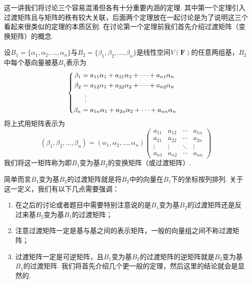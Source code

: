 这一讲我们将讨论三个容易混淆但各有十分重要内涵的定理. 其中第一个定理引入过渡矩阵且与矩阵的秩有较大关联，后面两个定理放在一起讨论是为了说明这三个看起来很类似的定理的本质区别. 在讨论第一个定理前我们首先介绍过渡矩阵（变换矩阵）的概念.
\begin{definition}{}{}
    设$B_1=\{\alpha_1,\alpha_2,\ldots,\alpha_n\}$与$B_2=\{\beta_1,\beta_2,\ldots,\beta_n\}$是线性空间$V(\mathbf{F})$的任意两组基，$B_2$中每个基向量被基$B_1$表示为
    \[ \begin{cases} \begin{aligned}
                \beta_1 & = a_{11}\alpha_1+a_{21}\alpha_2+\cdots+a_{n1}\alpha_n \\
                \beta_2 & = a_{12}\alpha_1+a_{22}\alpha_2+\cdots+a_{n2}\alpha_n \\
                        & \vdotswithin{=}                                       \\
                \beta_n & = a_{1n}\alpha_1+a_{2n}\alpha_2+\cdots+a_{nn}\alpha_n
            \end{aligned} \end{cases} \]
    将上式用矩阵表示为
    \[(\beta_1,\beta_2,\ldots,\beta_n)=(\alpha_1,\alpha_2,\ldots,\alpha_n)\begin{pmatrix}
            a_{11} & a_{12} & \cdots & a_{1n} \\
            a_{21} & a_{22} & \cdots & a_{2n} \\
            \vdots & \vdots & \ddots & \vdots \\
            a_{n1} & a_{n2} & \cdots & a_{nn}
        \end{pmatrix}\]
    我们将这一矩阵称为即$B_1$变为基$B_2$的变换矩阵（或过渡矩阵）.
\end{definition}
简单而言$B_1$变为基$B_2$的过渡矩阵就是将$B_2$中的向量在$B_1$下的坐标按列排列. 关于这一定义，我们有以下几点需要强调：
\begin{enumerate}
    \item 在之后的讨论或者题目中需要特别注意说的是$B_1$变为基$B_2$的过渡矩阵还是反过来基$B_2$变为基$B_1$的过渡矩阵；

    \item 注意过渡矩阵一定是基与基之间的表示矩阵，一般的向量组之间不称过渡矩阵；

    \item 过渡矩阵一定是可逆矩阵，且$B_1$变为基$B_2$的过渡矩阵的逆矩阵就是$B_2$变为基$B_1$的过渡矩阵. 我们将首先介绍几个更一般的定理，然后这里的结论就会是显然的.
\end{enumerate}

